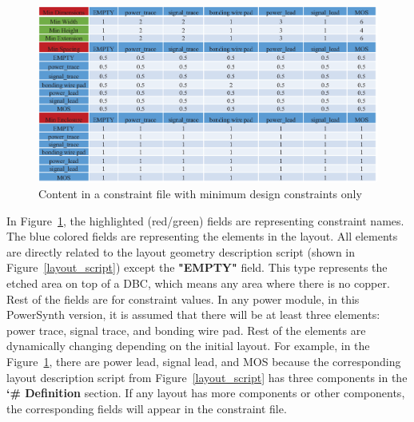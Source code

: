 \documentclass[11pt]{article}
\begin{document}
\begin{enumerate}
    \begin{figure}[H]
    \centering
    \includegraphics[width=\linewidth ]{figs/v_1.9_figs/cons_1.eps}
    \caption{Content in a constraint file with minimum design constraints only}
    \label{cons_values_new_0_rel_0}
    \end{figure}
In Figure~\ref{cons_values_new_0_rel_0}, the highlighted (red/green) fields are representing constraint names. The blue colored fields are representing the elements in the layout. All elements are directly related to the layout geometry description script (shown in Figure~\ref{layout_script}) except the \textbf{"EMPTY"} field. This type represents the etched area on top of a DBC, which means any area where there is no copper. Rest of the fields are for constraint values. In any power module, in this PowerSynth version, it is assumed that there will be at least three elements: power trace, signal trace, and bonding wire pad. Rest of the elements are dynamically changing depending on the initial layout. For example, in the Figure~\ref{cons_values_new_0_rel_0}, there are power lead, signal lead, and MOS because the corresponding layout description script from Figure~\ref{layout_script} has three components in the \textbf{`\# Definition} section. If any layout has more components or other components, the corresponding fields will appear in the constraint file.



\end{enumerate}
\end{document}
